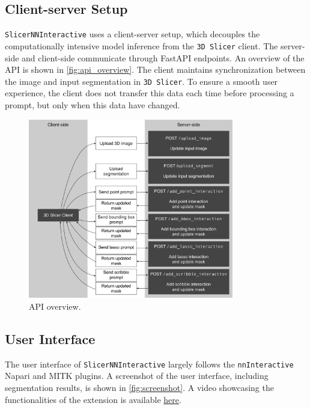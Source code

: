 \documentclass[
]{article}
\begin{document}
\subsection{Client-server Setup}\label{client-server-setup}

\texttt{SlicerNNInteractive} uses a client-server setup, which decouples
the computationally intensive model inference from the
\texttt{3D\ Slicer} client. The server-side and client-side communicate
through FastAPI endpoints. An overview of the API is shown in
\autoref{fig:api_overview}. The client maintains synchronization between
the image and input segmentation in \texttt{3D\ Slicer}. To ensure a
smooth user experience, the client does not transfer this data each time
before processing a prompt, but only when this data have changed.

\begin{figure}
\centering
\includegraphics[width=0.8\textwidth,height=\textheight]{img/nni_api.pdf}
\caption{API overview.\label{fig:api_overview}}
\end{figure}

\subsection{User Interface}\label{user-interface}

The user interface of \texttt{SlicerNNInteractive} largely follows the
\texttt{nnInteractive} Napari and MITK plugins. A screenshot of the user
interface, including segmentation results, is shown in
\autoref{fig:screenshot}. A video showcasing the functionalities of the
extension is available
\href{https://www.youtube.com/watch?v=mW_fUT1-IWM}{here}.
\end{document}
